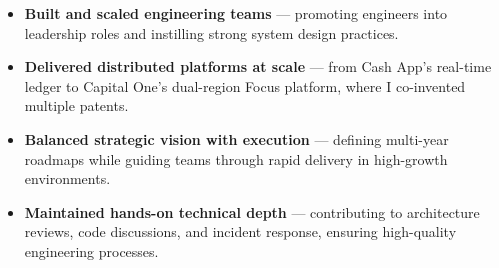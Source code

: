 \documentclass[]{cover}
\begin{document}

\begin{itemize}
    \item \textbf{Built and scaled engineering teams} — promoting engineers into leadership roles and instilling strong system design practices.
    \item \textbf{Delivered distributed platforms at scale} — from Cash App's real-time ledger to Capital One's dual-region Focus platform, where I co-invented multiple patents.
    \item \textbf{Balanced strategic vision with execution} — defining multi-year roadmaps while guiding teams through rapid delivery in high-growth environments.
    \item \textbf{Maintained hands-on technical depth} — contributing to architecture reviews, code discussions, and incident response, ensuring high-quality engineering processes.
\end{itemize}


   

\end{document}
